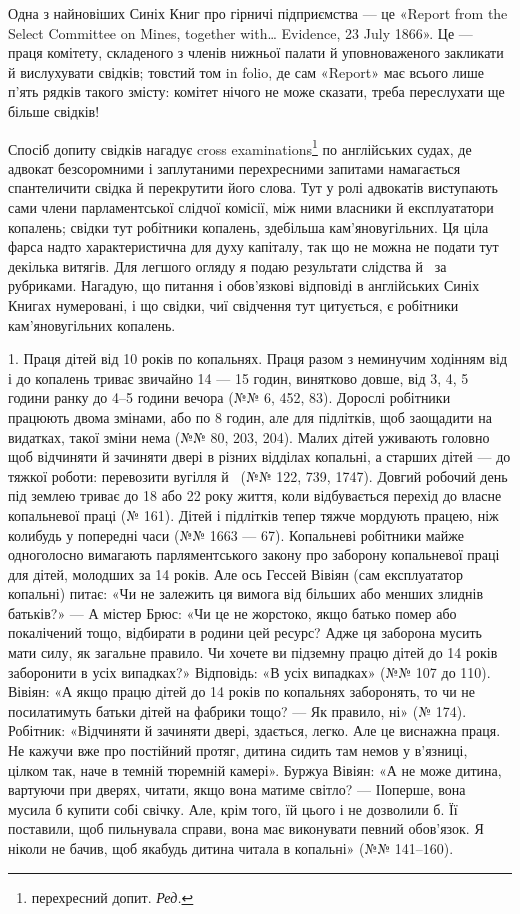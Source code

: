 Одна з найновіших Синіх Книг про гірничі підприємства —
це «Report from the Select Committee on Mines, together with\dots{}
Evidence, 23 July 1866». Це — праця комітету, складеного з
членів нижньої палати й уповноваженого закликати й вислухувати
свідків; товстий том in folio, де сам «Report» має всього
лише п’ять рядків такого змісту: комітет нічого не може сказати,
треба переслухати ще більше свідків!

Спосіб допиту свідків нагадує cross examinations\footnote*{
перехресний допит. \emph{Ред.}
} по англійських
судах, де адвокат безсоромними і заплутаними перехресними
запитами намагається спантеличити свідка й перекрутити
його слова. Тут у ролі адвокатів виступають сами члени парламентської
слідчої комісії, між ними власники й експлуататори копалень;
свідки тут робітники копалень, здебільша кам’яновугільних.
Ця ціла фарса надто характеристична для духу капіталу, так що
не можна не подати тут декілька витягів. Для легшого огляду
я подаю результати слідства й~ за рубриками. Нагадую, що
питання і обов’язкові відповіді в англійських Синіх Книгах
нумеровані, і що свідки, чиї свідчення тут цитується, є робітники
кам’яновугільних копалень.

\label{original-416}1. Праця дітей від 10 років по копальнях. Праця разом з
неминучим ходінням від і до копалень триває звичайно 14 —
15 годин, винятково довше, від 3, 4, 5 години ранку до 4--5 години
вечора (№№ 6, 452, 83). Дорослі робітники працюють двома
змінами, або по 8 годин, але для підлітків, щоб заощадити на
видатках, такої зміни нема (№№ 80, 203, 204). Малих дітей уживають
головно щоб відчиняти й зачиняти двері в різних відділах
копальні, а старших дітей — до тяжкої роботи: перевозити вугілля
й~ (№№ 122, 739, 1747). Довгий робочий день під землею
триває до 18 або 22 року життя, коли відбувається перехід до
власне копальневої праці (№ 161). Дітей і підлітків тепер тяжче
мордують працею, ніж колибудь у попередні часи (№№ 1663 —
67). Копальневі робітники майже одноголосно вимагають парляментського
закону про заборону копальневої праці для дітей,
молодших за 14 років. Але ось Гессей Вівіян (сам експлуататор
копальні) питає: «Чи не залежить ця вимога від більших або
менших злиднів батьків?» — А містер Брюс: «Чи це не жорстоко,
якщо батько помер або покалічений тощо, відбирати в родини
цей ресурс? Адже ця заборона мусить мати силу, як загальне
правило. Чи хочете ви підземну працю дітей до 14 років заборонити
в усіх випадках?» Відповідь: «В усіх випадках» (№№ 107
до 110). Вівіян: «А якщо працю дітей до 14 років по копальнях
заборонять, то чи не посилатимуть батьки дітей на фабрики
тощо? — Як правило, ні» (№ 174). Робітник: «Відчиняти й зачиняти
двері, здається, легко. Але це виснажна праця. Не кажучи
вже про постійний протяг, дитина сидить там немов у в’язниці,
цілком так, наче в темній тюремній камері». Буржуа Вівіян:
«А не може дитина, вартуючи при дверях, читати, якщо вона
матиме світло? — ІІоперше, вона мусила б купити собі свічку.
Але, крім того, їй цього і не дозволили б. Її поставили, щоб пильнувала
справи, вона має виконувати певний обов’язок. Я ніколи
не бачив, щоб якабудь дитина читала в копальні» (№№ 141--160).

